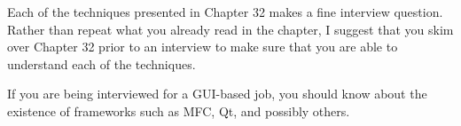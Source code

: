 
Each of the techniques presented in Chapter 32 makes a fine interview question. Rather than repeat what you already read in the chapter, I suggest that you skim over Chapter 32 prior to an interview to make sure that you are able to understand each of the techniques.

If you are being interviewed for a GUI-based job, you should know about the existence of frameworks such as MFC, Qt, and possibly others.



